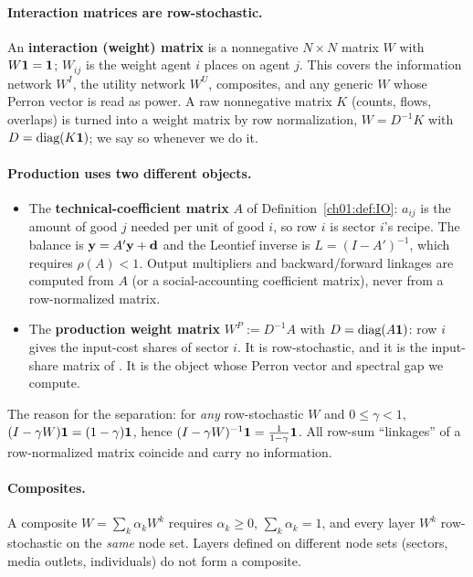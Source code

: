 \documentclass[../structural_economics_book.tex]{subfiles}
\begin{document}
\paragraph{Interaction matrices are row-stochastic.} An \textbf{interaction (weight) matrix} is a nonnegative $N \times N$ matrix $W$ with $W\mathbf{1} = \mathbf{1}$; $W_{ij}$ is the weight agent $i$ places on agent $j$. This covers the information network $W^I$, the utility network $W^U$, composites, and any generic $W$ whose Perron vector is read as power. A raw nonnegative matrix $K$ (counts, flows, overlaps) is turned into a weight matrix by row normalization, $W = D^{-1}K$ with $D = \text{diag}(K\mathbf{1})$; we say so whenever we do it.

\paragraph{Production uses two different objects.}
\begin{itemize}
\item The \textbf{technical-coefficient matrix} $A$ of Definition~\ref{ch01:def:IO}: $a_{ij}$ is the amount of good $j$ needed per unit of good $i$, so row $i$ is sector $i$'s recipe. The balance is $\mathbf{y} = A'\mathbf{y} + \mathbf{d}$ and the Leontief inverse is $L = (I - A')^{-1}$, which requires $\rho(A) < 1$. Output multipliers and backward/forward linkages are computed from $A$ (or a social-accounting coefficient matrix), never from a row-normalized matrix.
\item The \textbf{production weight matrix} $W^P := D^{-1}A$ with $D = \text{diag}(A\mathbf{1})$: row $i$ gives the input-cost shares of sector $i$. It is row-stochastic, and it is the input-share matrix of \citet{acemoglu2012network}. It is the object whose Perron vector and spectral gap we compute.
\end{itemize}
The reason for the separation: for \textit{any} row-stochastic $W$ and $0 \le \gamma < 1$, $(I - \gamma W)\mathbf{1} = (1-\gamma)\mathbf{1}$, hence $(I - \gamma W)^{-1}\mathbf{1} = \frac{1}{1-\gamma}\mathbf{1}$. All row-sum ``linkages'' of a row-normalized matrix coincide and carry no information.

\paragraph{Composites.} A composite $W = \sum_k \alpha_k W^k$ requires $\alpha_k \ge 0$, $\sum_k \alpha_k = 1$, and every layer $W^k$ row-stochastic on the \textit{same} node set. Layers defined on different node sets (sectors, media outlets, individuals) do not form a composite.
\end{document}

